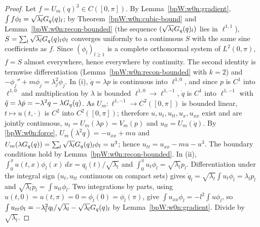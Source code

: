 \begin{proof}
\label{stepW:w0n:force}
Let $f=U_m(q)^3\in C([0,\pi])$. By Lemma~\ref{bpW:w0n:gradient}, $\int f\phi_l=\sqrt{\lambda_l}G_q(q)_l$; by
Theorem~\ref{bpW:w0n:cubic-bound} and Lemma~\ref{bpW:w0n:recon-bounded} (the sequence
$(\sqrt{\lambda_l}G_q(q)_l)$ lies in $\ell^{1,1}$), $S=\sum_l\sqrt{\lambda_l}G_q(q)_l\phi_l$ converges uniformly to a
continuous $S$ with the same sine coefficients as $f$. Since $(\phi_l)_{l\ge1}$ is a complete orthonormal system of
$L^2(0,\pi)$, $f=S$ almost everywhere, hence everywhere by continuity. The second identity is termwise
differentiation (Lemma~\ref{bpW:w0n:recon-bounded} with $k=2$) and $-\phi_j''+m\phi_j=\lambda_j^2\phi_j$.
\label{stepW:w0n:time}
In (i), $\dot q=\lambda p$ is continuous into $\ell^{1,0}$, and since $p$ is $C^1$ into $\ell^{1,0}$ and
multiplication by $\lambda$ is bounded $\ell^{1,0}\to\ell^{1,-1}$, $\dot q$ is $C^1$ into $\ell^{1,-1}$ with
$\ddot q=\lambda\dot p=-\lambda^2q-\lambda G_q(q)$. As $U_m:\ell^{1,-1}\to C^2([0,\pi])$ is bounded linear,
$t\mapsto u(t,\cdot)$ is $C^2$ into $C^2([0,\pi])$; therefore $u,u_t,u_{tt},u_x,u_{xx}$ exist and are jointly
continuous, $u_t=U_m(\lambda p)=V_m(p)$ and $u_{tt}=U_m(\ddot q)$.
\label{stepW:w0n:ident}
By \eqref{bpW:w0n:force}, $U_m(\lambda^2q)=-u_{xx}+mu$ and $U_m(\lambda G_q(q))=\sum_l\sqrt{\lambda_l}G_q(q)_l\phi_l=u^3$;
hence $u_{tt}=u_{xx}-mu-u^3$. The boundary conditions hold by Lemma~\ref{bpW:w0n:recon-bounded}.
\label{stepW:w0n:converse}
In (ii), $\int_0^\pi u(t,x)\phi_l(x)\,dx=q_l(t)/\sqrt{\lambda_l}$ and $\int_0^\pi u_t\phi_l=\sqrt{\lambda_l}p_l$.
Differentiation under the integral sign ($u_t,u_{tt}$ continuous on compact sets) gives
$\dot q_l=\sqrt{\lambda_l}\int u_t\phi_l=\lambda_lp_l$ and $\sqrt{\lambda_l}\dot p_l=\int u_{tt}\phi_l$. Two
integrations by parts, using $u(t,0)=u(t,\pi)=0=\phi_l(0)=\phi_l(\pi)$, give $\int u_{xx}\phi_l=-l^2\int u\phi_l$, so
$\int u_{tt}\phi_l=-\lambda_l^2q_l/\sqrt{\lambda_l}-\sqrt{\lambda_l}G_q(q)_l$ by Lemma~\ref{bpW:w0n:gradient}. Divide by
$\sqrt{\lambda_l}$.
\end{proof}
\par{}\par{}\par

